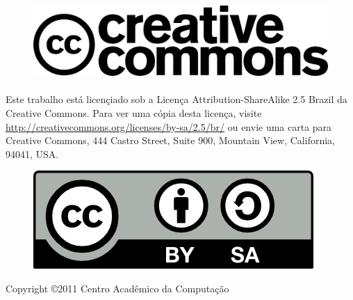 \documentclass[a4paper,10pt, twocolumn, twoside, titlepage]{article}
\begin{document}
\begin{figure}[H]
    \centering
    \includegraphics[scale=0.70,keepaspectratio=true]{img/cc_logo.png}
\end{figure}

\paragraph{}
Este trabalho está licençiado sob a Licença Attribution-ShareAlike 2.5 Brazil
da Creative Commons. Para ver uma cópia desta licença,
visite \url{http://creativecommons.org/licenses/by-sa/2.5/br/} ou envie uma
carta para Creative Commons, 444 Castro Street, Suite 900, Mountain View,
California, 94041, USA.

\begin{figure}[H]
    \centering
    \includegraphics[scale=0.50,keepaspectratio=true]{img/by-sa.png}
\end{figure}

\begin{center}
    Copyright \copyright  2011 Centro Acadêmico da Computação
\end{center}

\clearpage

\tableofcontents
\clearpage
\onecolumn



\clearpage

\onecolumn



\clearpage



\clearpage

\twocolumn
\end{document}
